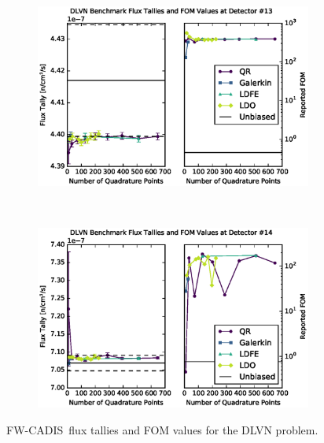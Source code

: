 \documentclass{article} %
\newcommand{\fwc}{\mbox{FW-CADIS}}
\begin{document}
\begin{figure}[!htb]
\ContinuedFloat
\begin{subfigure}{\linewidth}
\centering
\includegraphics[max height=0.445\textheight]
{img/dlvn-fwcadis-13.eps}
\label{dlvn-fwc-13}
\end{subfigure} 
\\
\begin{subfigure}{\linewidth}
\centering
\includegraphics[max height=0.445\textheight]
{img/dlvn-fwcadis-14.eps}
\label{dlvn-fwc-14}
\end{subfigure}
\caption{\fwc\ flux tallies and FOM values for the DLVN problem.}
\label{dlvn-fwc-tally}
\end{figure}

\FloatBarrier
\end{document}
